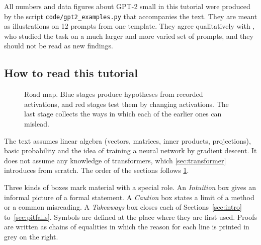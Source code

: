 \begin{caution}
All numbers and data figures about GPT-2 small in this tutorial were produced by the script
\texttt{code/gpt2\_examples.py} that accompanies the text. They are meant as illustrations on 12 prompts
from one template. They agree qualitatively with \citet{wang2023interpretability}, who studied the task on a much
larger and more varied set of prompts, and they should not be read as new findings.
\end{caution}

\subsection{How to read this tutorial}

\begin{figure}[t]
\centering
{}
\caption{Road map. Blue stages produce hypotheses from recorded activations, and red stages test them by changing
activations. The last stage collects the ways in which each of the earlier ones can mislead.}
\label{fig:roadmap}
\end{figure}

The text assumes linear algebra (vectors, matrices, inner products, projections), basic probability and the idea
of training a neural network by gradient descent. It does not assume any knowledge of transformers, which
\cref{sec:transformer} introduces from scratch. The order of the sections follows \cref{fig:roadmap}.

Three kinds of boxes mark material with a special role. An \emph{Intuition} box gives an informal picture of a
formal statement. A \emph{Caution} box states a limit of a method or a common misreading. A \emph{Takeaways} box
closes each of Sections~\ref{sec:intro} to~\ref{sec:pitfalls}. Symbols are defined at the place where they are
first used. Proofs are written as chains of equalities in which the reason for each line is printed in grey on the
right.


